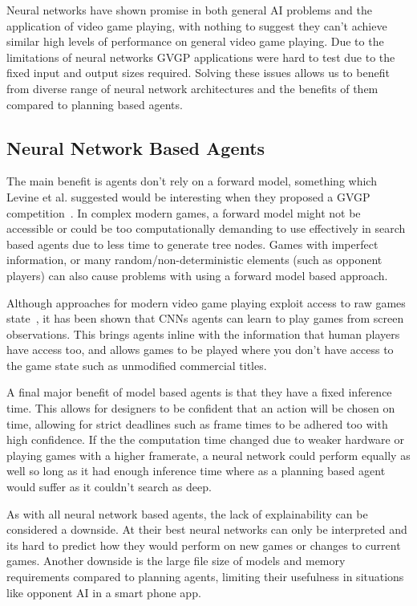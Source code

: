 Neural networks have shown promise in both general AI problems and the application of video game playing, with nothing to suggest they can't achieve similar high levels of performance on general video game playing.
Due to the limitations of neural networks GVGP applications were hard to test due to the fixed input and output sizes required.
Solving these issues allows us to benefit from diverse range of neural network architectures and the benefits of them compared to planning based agents.

\subsection{Neural Network Based Agents}
The main benefit is agents don't rely on a forward model, something which Levine et al. suggested would be interesting when they proposed a GVGP competition~\cite{GVGP}.
In complex modern games, a forward model might not be accessible or could be too computationally demanding to use effectively in search based agents due to less time to generate tree nodes.
Games with imperfect information, or many random/non-deterministic elements (such as opponent players) can also cause problems with using a forward model based approach.
\par
Although approaches for modern video game playing exploit access to raw games state~\cite{OpenAIFive, alphastarblog}, it has been shown that CNNs agents can learn to play games from screen observations.
This brings agents inline with the information that human players have access too, and allows games to be played where you don't have access to the game state such as unmodified commercial titles.
\par
A final major benefit of model based agents is that they have a fixed inference time.
This allows for designers to be confident that an action will be chosen on time, allowing for strict deadlines such as frame times to be adhered too with high confidence.
If the the computation time changed due to weaker hardware or playing games with a higher framerate, a neural network could perform equally as well so long as it had enough inference time where as a planning based agent would suffer as it couldn't search as deep.
\par
As with all neural network based agents, the lack of explainability can be considered a downside.
At their best neural networks can only be interpreted and its hard to predict how they would perform on new games or changes to current games.
Another downside is the large file size of models and memory requirements compared to planning agents, limiting their usefulness in situations like opponent AI in a smart phone app.

